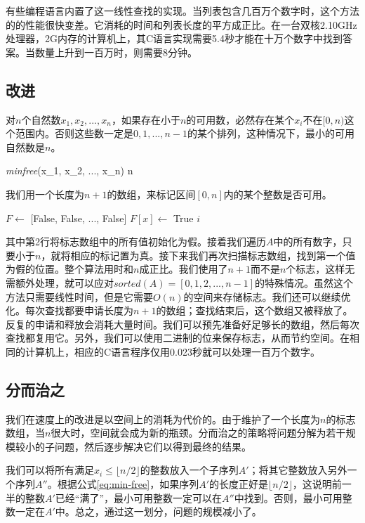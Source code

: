 \documentclass[b5paper]{ctexart}
\begin{document}
有些编程语言内置了这一线性查找的实现。当列表包含几百万个数字时，这个方法的的性能很快变差。它消耗的时间和列表长度的平方成正比。在一台双核2.10GHz处理器，2G内存的计算机上，其C语言实现需要5.4秒才能在十万个数字中找到答案。当数量上升到一百万时，则需要8分钟。

\subsection*{改进}
对$n$个自然数$x_1, x_2, ..., x_n$，如果存在小于$n$的可用数，必然存在某个$x_i$不在$[0, n)$这个范围内。否则这些数一定是$0, 1, ..., n - 1$的某个排列，这种情况下，最小的可用自然数是$n$。

\be
\textit{minfree}(x_1, x_2, ..., x_n) \leq n
\label{eq:min-free}
\ee

我们用一个长度为$n + 1$的数组，来标记区间$[0, n]$内的某个整数是否可用。

\begin{algorithmic}[1]
  \State $F \gets$ [False, False, ..., False] 
      \State $F[x] \gets$ True
    \EndIf
  \EndFor
      \State \Return $i$
    \EndIf
  \EndFor
\EndFunction
\end{algorithmic}

其中第2行将标志数组中的所有值初始化为假。接着我们遍历$A$中的所有数字，只要小于$n$，就将相应的标记置为真。接下来我们再次扫描标志数组，找到第一个值为假的位置。整个算法用时和$n$成正比。我们使用了$n + 1$而不是$n$个标志，这样无需额外处理，就可以应对$sorted(A) = [0, 1, 2, ..., n-1]$的特殊情况。虽然这个方法只需要线性时间，但是它需要$O(n)$的空间来存储标志。我们还可以继续优化。每次查找都要申请长度为$n + 1$的数组；查找结束后，这个数组又被释放了。反复的申请和释放会消耗大量时间。我们可以预先准备好足够长的数组，然后每次查找都复用它。另外，我们可以使用二进制的位来保存标志，从而节约空间。在相同的计算机上，相应的C语言程序仅用0.023秒就可以处理一百万个数字。

\subsection*{分而治之}
我们在速度上的改进是以空间上的消耗为代价的。由于维护了一个长度为$n$的标志数组，当$n$很大时，空间就会成为新的瓶颈。分而治之的策略将问题分解为若干规模较小的子问题，然后逐步解决它们以得到最终的结果。

我们可以将所有满足$x_i \leq \lfloor n/2 \rfloor$的整数放入一个子序列$A'$；将其它整数放入另外一个序列$A''$。根据公式\ref{eq:min-free}，如果序列$A'$的长度正好是$\lfloor n/2 \rfloor$，这说明前一半的整数$A'$已经“满了”，最小可用整数一定可以在$A''$中找到。否则，最小可用整数一定在$A'$中。总之，通过这一划分，问题的规模减小了。
\end{document}
